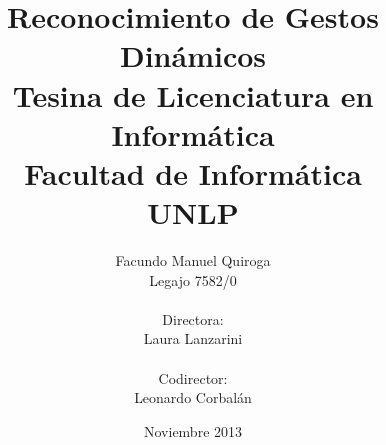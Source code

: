 ﻿
\title{Reconocimiento de Gestos Dinámicos \\
Tesina de Licenciatura en Informática \\
Facultad de Informática\\ 
UNLP \\}
\author{
Facundo Manuel Quiroga\\
Legajo 7582/0\\ \\
Directora:\\
Laura Lanzarini\\ \\
Codirector:\\
Leonardo Corbalán\\
}

\date{Noviembre 2013}


